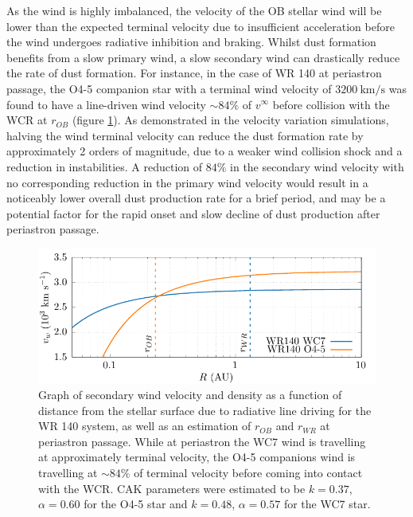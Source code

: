 As the wind is highly imbalanced, the velocity of the OB stellar wind will be lower than the expected terminal velocity due to insufficient acceleration before the wind undergoes radiative inhibition and braking.
Whilst dust formation benefits from a slow primary wind, a slow secondary wind can drastically reduce the rate of dust formation.
For instance, in the case of WR 140 at periastron passage, the O4-5 companion star with a terminal wind velocity of $\SI{3200}{\kilo\metre\per\second}$ was found to have a line-driven wind velocity $\sim 84\%$ of $v^\infty$ before collision with the WCR at $r_{OB}$ (figure \ref{fig:wr140-stagnation-obwind}).
As demonstrated in the velocity variation simulations, halving the wind terminal velocity can reduce the dust formation rate by approximately 2 orders of magnitude, due to a weaker wind collision shock and a reduction in instabilities.
A reduction of $84\%$ in the secondary wind velocity with no corresponding reduction in the primary wind velocity would result in a noticeably lower overall dust production rate for a brief period, and may be a potential factor for the rapid onset and slow decline of dust production after periastron passage. %

\begin{figure}
  \centering
  \includegraphics{assets/stagnation-point/stag.pdf}
  \caption[Stagnation point wind velocity]{Graph of secondary wind velocity and density as a function of distance from the stellar surface due to radiative line driving for the WR 140 system, as well as an estimation of $r_{OB}$ and $r_{WR}$ at periastron passage. While at periastron the WC7 wind is travelling at approximately terminal velocity, the O4-5 companions wind is travelling at $\sim 84\%$ of terminal velocity before coming into contact with the WCR. CAK parameters were estimated to be $k = 0.37$, $\alpha = 0.60$ for the O4-5 star and $k=0.48$, $\alpha = 0.57$ for the WC7 star.}
  \label{fig:wr140-stagnation-obwind}
\end{figure}

